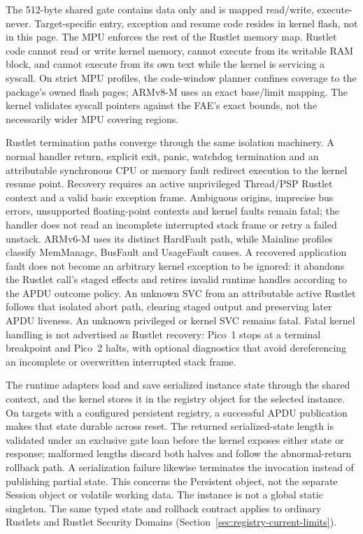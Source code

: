 The 512-byte shared gate contains data only and is mapped read/write,
execute-never. Target-specific entry, exception and resume code resides in
kernel flash, not in this page. The MPU enforces the rest of the Rustlet memory map. Rustlet code cannot read or write kernel
memory, cannot execute from its writable RAM block, and cannot execute from its
own text while the kernel is servicing a syscall. On strict MPU profiles,
the code-window planner confines coverage to the package's owned flash pages;
ARMv8-M uses an exact base/limit mapping. The kernel validates syscall pointers
against the FAE's exact bounds, not the necessarily wider MPU covering regions.

Rustlet termination paths converge through the same isolation machinery. A
normal handler return, explicit exit, panic, watchdog termination and an
attributable synchronous CPU or memory fault redirect execution to the kernel
resume point. Recovery requires an active unprivileged Thread/PSP Rustlet
context and a valid basic exception frame. Ambiguous origins, imprecise bus
errors, unsupported floating-point contexts and kernel faults remain fatal;
the handler does not read an incomplete interrupted stack frame or retry a
failed unstack. ARMv6-M uses its distinct HardFault path, while Mainline
profiles classify MemManage, BusFault and UsageFault causes. A recovered
application fault does not become an arbitrary kernel exception to be ignored:
it abandons the Rustlet call's staged effects and retires invalid runtime
handles according to the APDU outcome policy.
An unknown SVC from an attributable active Rustlet follows that isolated
abort path, clearing staged output and preserving later APDU liveness. An
unknown privileged or kernel SVC remains fatal. Fatal kernel handling is not
advertised as Rustlet recovery: Pico~1 stops at a terminal breakpoint and
Pico~2 halts, with optional diagnostics that avoid dereferencing an incomplete
or overwritten interrupted stack frame.

The runtime adapters load and save serialized instance state through the
shared context, and the kernel stores it in the registry object for the
selected instance. On targets with a configured persistent registry, a
successful APDU publication makes that state durable across reset. The
returned serialized-state length is validated under an exclusive gate loan
before the kernel exposes either state or response; malformed lengths discard
both halves and follow the abnormal-return rollback path. A serialization
failure likewise terminates the invocation instead of publishing partial
state. This concerns the Persistent object, not the separate Session object
or volatile working data. The instance is not a global static singleton.
The same typed state and rollback contract applies to ordinary Rustlets and
Rustlet Security Domains (Section~\ref{sec:registry-current-limits}).

